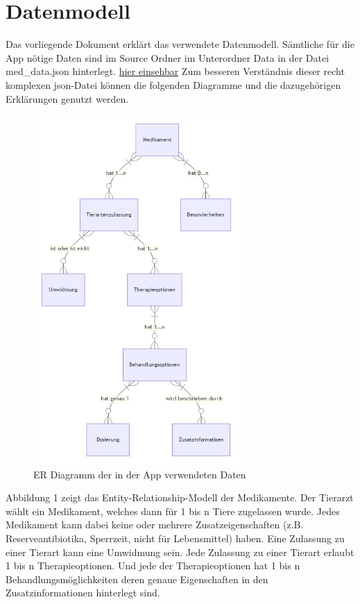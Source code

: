 \documentclass[a4paper]{article}
\begin{document}
\section{Datenmodell}
Das vorliegende Dokument erklärt das verwendete Datenmodell. Sämtliche für die App nötige Daten sind im Source Ordner im Unterordner Data in der Datei med\_data.json 
hinterlegt. \href{https://github.com/pigutsche/dosi_calc/blob/main/src/dosi_calc/app/data/med_data.json}{hier einsehbar} Zum besseren Verständnis dieser recht komplexen json-Datei können die folgenden Diagramme und die dazugehörigen Erklärungen genutzt werden.


    \begin{figure}[h]
        \centering
        \includegraphics[width=0.7\textwidth]{er_diagramm}
        \caption{ER Diagramm der in der App verwendeten Daten}
    \end{figure}

Abbildung 1 zeigt das Entity-Relationship-Modell der Medikamente. Der Tierarzt wählt ein Medikament, welches dann für 1 bis n Tiere zugelassen wurde. Jedes Medikament 
kann dabei keine oder mehrere Zusatzeigenschaften (z.B. Reserveantibiotika, Sperrzeit, nicht für Lebensmittel) haben. Eine Zulassung zu einer Tierart kann eine Umwidmung sein.
Jede Zulassung zu einer Tierart erlaubt 1 bis n Therapieoptionen. Und jede der Therapieoptionen hat 1 bis n Behandlungsmöglichkeiten deren genaue Eigenschaften in den Zusatzinformationen
hinterlegt sind.
\end{document}

